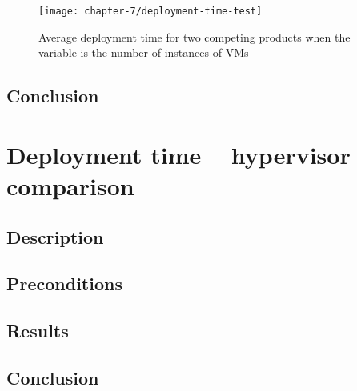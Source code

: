 \begin{figure}[!ht]
  \begin{center}
    \texttt{[image: chapter-7/deployment-time-test]}
  \end{center}
  \caption{Average deployment time for two competing products when the variable is the number of instances of VMs}
  \label{ch7:deployment-time-test}
\end{figure}

\subsection*{Conclusion}


\section{Deployment time -- hypervisor comparison}
\subsection*{Description}
\subsection*{Preconditions}
\subsection*{Results}
\subsection*{Conclusion}

